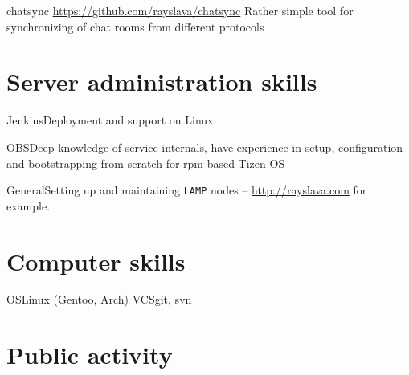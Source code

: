 \documentclass[11pt,a4paper]{moderncv}
\begin{document}
\cvitem
  {chatsync}
  {\url{https://github.com/rayslava/chatsync}\newline{}
  Rather simple tool for synchronizing of chat rooms from different protocols}

\section{Server administration skills}
\cvitem
  {Jenkins}{Deployment and support on Linux}

\cvitem
  {OBS}{Deep knowledge of service internals, have experience in setup, configuration and bootstrapping from
    scratch for rpm-based Tizen OS}

\cvitem
  {General}{Setting up and maintaining \texttt{LAMP} nodes -- \url{http://rayslava.com} for example.}

\section{Computer skills}
  \cvitem
  {OS}{Linux (Gentoo, Arch)}
  \cvitem
  {VCS}{git, svn}

\section{Public activity}
\end{document}
